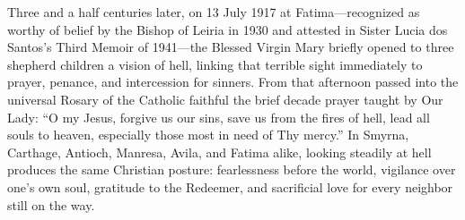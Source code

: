 Three and a half centuries later, on 13 July 1917 at Fatima---recognized as worthy of belief by the Bishop of Leiria in 1930 and attested in Sister Lucia dos Santos's Third Memoir of 1941---the Blessed Virgin Mary briefly opened to three shepherd children a vision of hell, linking that terrible sight immediately to prayer, penance, and intercession for sinners. From that afternoon passed into the universal Rosary of the Catholic faithful the brief decade prayer taught by Our Lady: ``O my Jesus, forgive us our sins, save us from the fires of hell, lead all souls to heaven, especially those most in need of Thy mercy.'' In Smyrna, Carthage, Antioch, Manresa, Avila, and Fatima alike, looking steadily at hell produces the same Christian posture: fearlessness before the world, vigilance over one's own soul, gratitude to the Redeemer, and sacrificial love for every neighbor still on the way.
